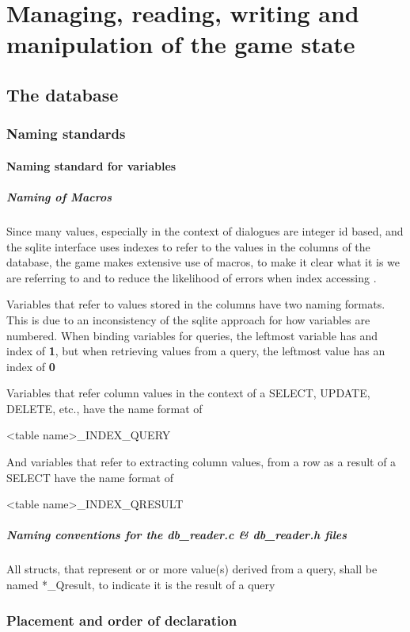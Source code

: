 \documentclass{report}
\begin{document}
\section*{Managing, reading, writing and manipulation of the game state}
\subsection*{The database}
\subsubsection*{Naming standards}
\paragraph*{Naming standard for variables}
\subparagraph*{Naming of Macros}
Since many values, especially in the context of dialogues are integer id based, and the sqlite interface uses indexes to refer to the values in the columns of the database, the game makes extensive use of macros, to make it clear what it is we are referring to and to reduce the likelihood of errors when index accessing .\newline

Variables that refer to values stored in the columns have two naming formats. This is due to an inconsistency of the sqlite approach for how variables are numbered. When binding variables for queries, the leftmost variable has and index of \textbf{1}, but when retrieving values from a query, the leftmost value has an index of \textbf{0}

Variables that refer column values in the context of a SELECT, UPDATE, DELETE, etc., have the name format of 

\begin{center}
<table name>\_<column name>INDEX\_QUERY
\end{center}

And variables that refer to extracting column values, from a row as a result of a SELECT have the name format of

\begin{center}
<table name>\_<column name>INDEX\_QRESULT
\end{center}

\subparagraph*{Naming conventions for the db\_reader.c \& db\_reader.h files}
All structs, that represent or or more value(s) derived from a query, shall be named *\_Qresult, to indicate it is the result of a query
\subsubsection*{Placement and order of declaration}
\end{document}
